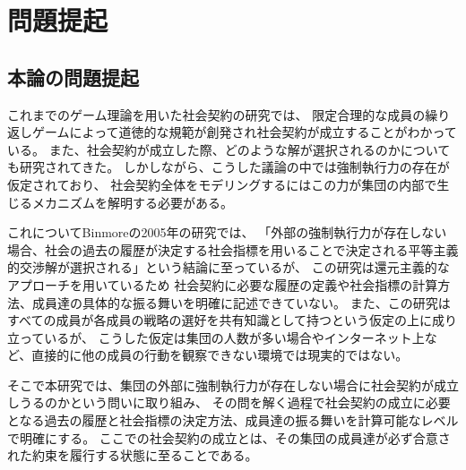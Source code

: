 \chapter{問題提起}
\section{本論の問題提起}
これまでのゲーム理論を用いた社会契約の研究では、
限定合理的な成員の繰り返しゲームによって道徳的な規範が創発され社会契約が成立することがわかっている\cite{skyrms1996}\cite{skyrms2004}。
また、社会契約が成立した際、どのような解が選択されるのかについても研究されてきた。\cite{rawls1971}\cite{harsanyi1955}\cite{gauthier1986}
しかしながら、こうした議論の中では強制執行力の存在が仮定されており、
社会契約全体をモデリングするにはこの力が集団の内部で生じるメカニズムを解明する必要がある。

これについてBinmoreの2005年の研究\cite{binmore2005}では、
「外部の強制執行力が存在しない場合、社会の過去の履歴が決定する社会指標を用いることで決定される平等主義的交渉解が選択される」という結論に至っているが、
この研究は還元主義的なアプローチを用いているため
社会契約に必要な履歴の定義や社会指標の計算方法、成員達の具体的な振る舞いを明確に記述できていない。
また、この研究はすべての成員が各成員の戦略の選好を共有知識として持つという仮定の上に成り立っているが、
こうした仮定は集団の人数が多い場合やインターネット上など、直接的に他の成員の行動を観察できない環境では現実的ではない。

そこで本研究では、集団の外部に強制執行力が存在しない場合に社会契約が成立しうるのかという問いに取り組み、
その問を解く過程で社会契約の成立に必要となる過去の履歴と社会指標の決定方法、成員達の振る舞いを計算可能なレベルで明確にする。
ここでの社会契約の成立とは、その集団の成員達が必ず合意された約束を履行する状態に至ることである。



